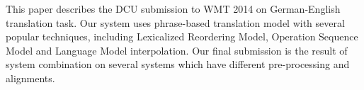 This paper describes the DCU submission to WMT 2014 on German-English translation task. Our system uses phrase-based translation model with several popular techniques, including Lexicalized Reordering Model, Operation Sequence Model and Language Model interpolation. Our final submission is the result of system combination on several systems which have different pre-processing and alignments.
